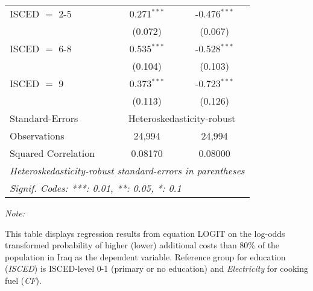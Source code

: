 \begin{table}[htbp!]
\begin{adjustbox}{width = 1\textwidth, max height = 0.95\textheight, center}
\begin{threeparttable}[b]
\begin{tabular}{lcc}
            ISCED $=$ 2-5        & 0.271$^{***}$ & -0.476$^{***}$\\   
                                 & (0.072)       & (0.067)\\   
            ISCED $=$ 6-8        & 0.535$^{***}$ & -0.528$^{***}$\\   
                                 & (0.104)       & (0.103)\\   
            ISCED $=$ 9          & 0.373$^{***}$ & -0.723$^{***}$\\   
                                 & (0.113)       & (0.126)\\   
            \midrule 
            Standard-Errors & \multicolumn{2}{c}{Heteroskedasticity-robust} \\ 
            Observations         & 24,994        & 24,994\\  
            Squared Correlation  & 0.08170       & 0.08000\\  
            \midrule \midrule
            \multicolumn{3}{l}{\emph{Heteroskedasticity-robust standard-errors in parentheses}}\\
            \multicolumn{3}{l}{\emph{Signif. Codes: ***: 0.01, **: 0.05, *: 0.1}}\\
         \end{tabular}
         
         \begin{tablenotes}\item \medskip \textit{Note:}
            \item This table displays regression results from equation LOGIT on the log-odds transformed probability of higher (lower) additional costs than 80\% of the population in Iraq as the dependent variable. Reference group for education (\textit{ISCED}) is ISCED-level 0-1 (primary or no education) and \textit{Electricity} for cooking fuel (\textit{CF}).
         \end{tablenotes}
      \end{threeparttable}
   \end{adjustbox}
\end{table}


